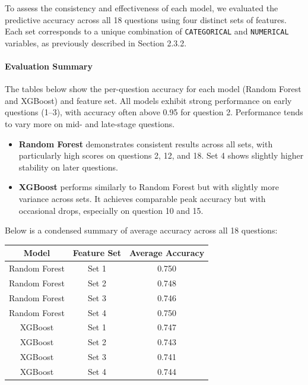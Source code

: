 \documentclass[12pt]{article}
\begin{document}
	To assess the consistency and effectiveness of each model, we evaluated the predictive accuracy across all 18 questions using four distinct sets of features. Each set corresponds to a unique combination of \texttt{CATEGORICAL} and \texttt{NUMERICAL} variables, as previously described in Section 2.3.2.
	
	\vspace{0.5em}
	\paragraph{Evaluation Summary}
	
	The tables below show the per-question accuracy for each model (Random Forest and XGBoost) and feature set. All models exhibit strong performance on early questions (1–3), with accuracy often above 0.95 for question 2. Performance tends to vary more on mid- and late-stage questions.
	
	\vspace{0.5em}
	\begin{itemize}
		\item \textbf{Random Forest} demonstrates consistent results across all sets, with particularly high scores on questions 2, 12, and 18. Set 4 shows slightly higher stability on later questions.
		\item \textbf{XGBoost} performs similarly to Random Forest but with slightly more variance across sets. It achieves comparable peak accuracy but with occasional drops, especially on question 10 and 15.
	\end{itemize}
	
	\noindent Below is a condensed summary of average accuracy across all 18 questions:
	
	\begin{center}
		\begin{tabular}{|c|c|c|}
			\hline
			\textbf{Model} & \textbf{Feature Set} & \textbf{Average Accuracy} \\
			\hline
			Random Forest & Set 1 & 0.750 \\
			Random Forest & Set 2 & 0.748 \\
			Random Forest & Set 3 & 0.746 \\
			Random Forest & Set 4 & 0.750 \\
			\hline
			XGBoost       & Set 1 & 0.747 \\
			XGBoost       & Set 2 & 0.743 \\
			XGBoost       & Set 3 & 0.741 \\
			XGBoost       & Set 4 & 0.744 \\
			\hline
		\end{tabular}
	\end{center}
	
\end{document}
